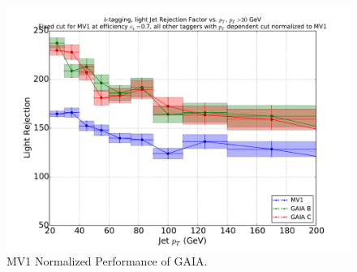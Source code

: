\begin{figure}
\includegraphics[width=\textwidth]{figures/btag/u_rej_mv1normalized_pTdep_70pct.pdf}
\caption[The ATLAS detector]{MV1 Normalized Performance of GAIA.
\label{fig:urejmv1norm70}}
\end{figure}



















%







